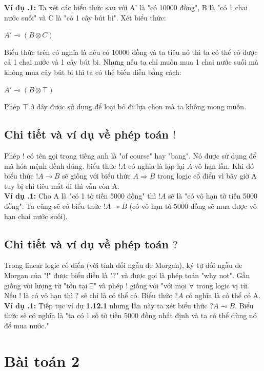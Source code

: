\documentclass[a4paper]{article}
\begin{document}
\textbf{Ví dụ \thesubsection.1:} Ta xét các biểu thức sau với A' là "có 10000 đồng", B là "có 1 chai nước suối" và C là "có 1 cây bút bi". Xét biểu thức:\\
\begin{center}
    $A' \multimap (B \otimes C)$
\end{center}
Biểu thức trên có nghĩa là nêu có 10000 đồng và ta tiêu nó thì ta có thể có được cả 1 chai nước và 1 cây bút bi. Nhưng nếu ta chỉ muốn mua 1 chai nước suối mà không mua cây bút bi thì ta có thể biểu diễn bằng cách:\\
\begin{center}
    $A' \multimap (B \otimes \top)$
\end{center}
Phép $\top$ ở dây được sử dụng để loại bỏ đi lựa chọn mà ta không mong muốn.

\subsection{Chi tiết và ví dụ về phép toán $!$} 
Phép $!$ có tên gọi trong tiếng anh là "of course" hay "bang". Nó được sử dụng để mã hóa mệnh đềnh đúng. biểu thức $!A$ có nghĩa là lặp lại $A$ vô hạn lần. Khi đó biểu thức $!A \multimap B$ sẽ giống với biểu thức $A \Rightarrow B$ trong logic cổ điển vì bây giờ A tuy bị chi tiêu mất đi thì vẫn còn A.\\

\textbf{Ví dụ \thesubsection.1:} Cho A là "có 1 tờ tiền 5000 đồng" thì $!A$ sẽ là "có vô hạn tờ tiền 5000 đồng". Ta cũng sẽ có biểu thức $!A \multimap B$ (có vô hạn tờ 5000 đồng sẽ mua được vô hạn chai nước suối).

\subsection{Chi tiết và ví dụ về phép toán $?$}
Trong linear logic cổ điển (với tính đối ngẫu de Morgan), ký tự đối ngẫu de Morgan của "$!$" được biểu diễn là "$?$" và được gọi là phép toán "why not". Gần giống với lượng từ "tồn tại $\exists$" và phép $!$ giống với "với mọi $\forall$ trong logic vị từ. Nếu $!$ là có vô hạn thì $?$ sẽ chỉ là có thể có. Biểu thức $?A$ có nghĩa là có thể có A.\\

\textbf{Ví dụ \thesubsection.1:} Tiếp tục ví dụ \textbf{1.12.1} nhưng lần này ta xét biểu thức $?A \multimap B$. Biểu thức sẽ có nghĩa là "ta có 1 số tờ tiền 5000 đồng nhất định và ta có thể dùng nó để mua nước."

\section{Bài toán 2}
\end{document}
